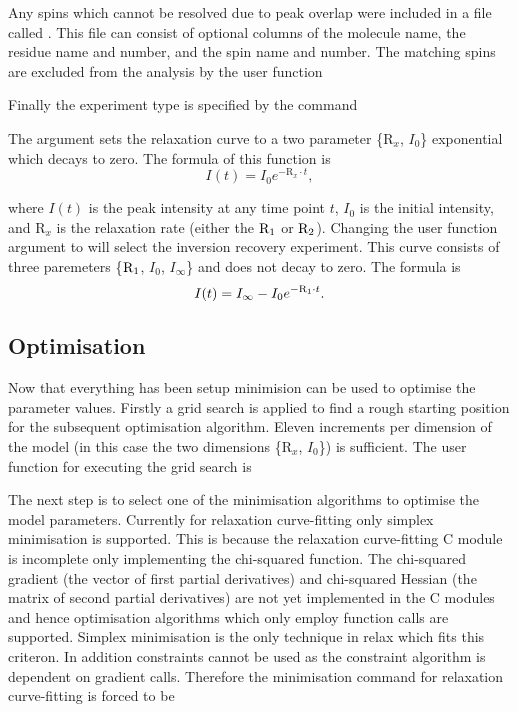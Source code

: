 Any spins which cannot be resolved due to peak overlap were included in a file called .  This file can consist of optional columns of the molecule name, the residue name and number, and the spin name and number.  The matching spins are excluded from the analysis by the user function


Finally the experiment type is specified by the command


The argument  sets the relaxation curve to a two parameter \{$\mathrm{R}_x$, $I_0$\} exponential which decays to zero.  The formula of this function is
\begin{equation}
 I(t) = I_0 e^{-\mathrm{R}_x \cdot t},
\end{equation}

\noindent where $I(t)$ is the peak intensity at any time point $t$, $I_0$ is the initial intensity, and $\mathrm{R}_x$ is the relaxation rate (either the $\mathrm{R}_1$ or $\mathrm{R}_2$).  Changing the user function argument to  will select the inversion recovery experiment.  This curve consists of three paremeters \{$\mathrm{R}_1$, $I_0$, $I_{\infty}$\} and does not decay to zero.  The formula is
\begin{equation}
 I(t) = I_{\infty} - I_0 e^{-\mathrm{R}_1 \cdot t}.
\end{equation}




\subsection{Optimisation}

Now that everything has been setup minimision can be used to optimise the parameter values.  Firstly a grid search is applied to find a rough starting position for the subsequent optimisation algorithm.  Eleven increments per dimension of the model (in this case the two dimensions \{$\mathrm{R}_x$, $I_0$\}) is sufficient.  The user function for executing the grid search is


The next step is to select one of the minimisation algorithms to optimise the model parameters.  Currently for relaxation curve-fitting only simplex minimisation is supported.  This is because the relaxation curve-fitting C module is incomplete only implementing the chi-squared function.  The chi-squared gradient (the vector of first partial derivatives) and chi-squared Hessian (the matrix of second partial derivatives) are not yet implemented in the C modules and hence optimisation algorithms which only employ function calls are supported.  Simplex minimisation is the only technique in relax which fits this criteron.  In addition constraints cannot be used as the constraint algorithm is dependent on gradient calls.  Therefore the minimisation command for relaxation curve-fitting is forced to be


